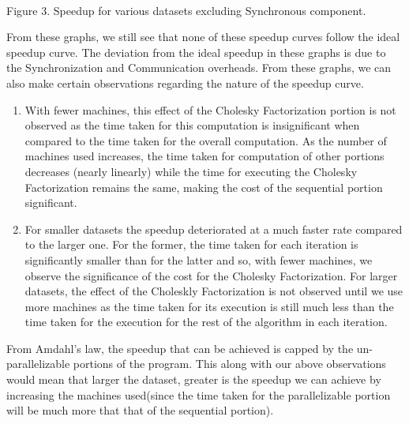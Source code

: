 \documentclass[12pt]{article}
\begin{document}
\ \\
\centerline{Figure 3. Speedup for various datasets excluding Synchronous component.}
\newline\newline
From these graphs, we still see that none of these speedup curves follow the ideal speedup curve. The deviation from the ideal speedup in these graphs is due to the Synchronization and Communication overheads.
\newline\newline
From these graphs, we can also make certain observations regarding the nature of the speedup curve.
\begin{enumerate}[label=(\alph*)]
\item With fewer machines, this effect of the Cholesky Factorization portion is not observed as the time taken	 for this computation is insignificant when compared to the time taken for the overall computation. As the number of machines used increases, the time taken for computation of other portions decreases (nearly linearly) while the time for executing the Cholesky Factorization remains the same, making the cost of the sequential portion significant.
\item For smaller datasets the speedup deteriorated at a much faster rate compared to the larger one. For the former, the time taken for each iteration is significantly smaller than for the latter and so, with fewer machines, we observe the significance of the cost for the Cholesky Factorization. For larger datasets, the effect of the Choleskly Factorization is not observed until we use more machines as the time taken for its execution is still much less than the time taken for the execution for the rest of the algorithm in each iteration.
\end{enumerate}
From Amdahl's law, the speedup that can be achieved is capped by the un-parallelizable portions of the program. This along with our above observations would mean that larger the dataset, greater is the speedup we can achieve by increasing the machines used(since the time taken for the parallelizable portion will be much more that that of the sequential portion).
\end{document}
